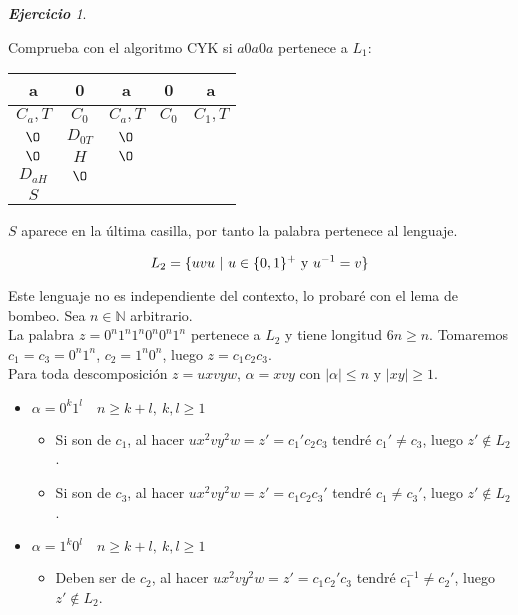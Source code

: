 \documentclass[12pt,spanish]{article}
\theoremstyle{definition}
\theoremstyle{remark}
\newtheorem{exercise}{\textbf{Ejercicio}}%
\begin{document}
\begin{exercise}
\begin{multicols}{4}
  \end{multicols}

  Comprueba con el algoritmo CYK si $a0a0a$ pertenece a $L_1$:

  \begin{table}[H]
    \centering
    \begin{tabular}{|c|cccc} \hline a & \multicolumn{1}{c|}{0} &
\multicolumn{1}{c|}{a} & \multicolumn{1}{c|}{0} &
\multicolumn{1}{c|}{a} \\ \hline $C_a,T$ & \multicolumn{1}{c|}{$C_0$}
& \multicolumn{1}{c|}{$C_a,T$} & \multicolumn{1}{c|}{$C_0$} &
\multicolumn{1}{c|}{$C_1,T$} \\ \hline $\O$ &
\multicolumn{1}{c|}{$D_{0T}$} & \multicolumn{1}{c|}{$\O$} & & \\
\cline{1-3} $\O$ & \multicolumn{1}{c|}{$H$} &
\multicolumn{1}{c|}{$\O$} & & \\ \cline{1-3} $D_{aH}$ &
\multicolumn{1}{c|}{$\O$} & & & \\ \cline{1-2} $S$ & & & & \\
\cline{1-1}
    \end{tabular}
  \end{table}

  $S$ aparece en la última casilla, por tanto la palabra pertenece al
  lenguaje.

  \newpage
  
  \[L_2=\{uvu\ |\ u \in \{0,1\}^+ \text{ y } u^{-1}=v\}\vspace{5mm}\]
  
  Este lenguaje no es independiente del contexto, lo probaré con el
  lema de bombeo. Sea $n\in \mathbb{N}$ arbitrario.\\ 

  La palabra $z=0^n1^n1^n0^n0^n1^n$ pertenece a $L_2$ y tiene longitud
  $6n \geq n$. Tomaremos $c_1=c_3=0^n1^n$, $c_2=1^n0^n$, luego
  $z=c_1c_2c_3$. \\

  Para toda descomposición $z=uxvyw$, $\alpha=xvy$ con
  $|\alpha|\leq n$ y $|xy|\geq 1$.

  \begin{itemize}
  \item $\alpha = 0^k1^l \quad n \geq k+l,\ k,l\geq 1$
    \begin{itemize}
    \item Si son de $c_1$, al hacer $ux^2vy^2w=z'=c_1'c_2c_3$ tendré
      $c_1'\neq c_3$, luego $z' \notin L_2$.
    \item Si son de $c_3$, al hacer $ux^2vy^2w=z'=c_1c_2c_3'$ tendré
      $c_1\neq c_3'$, luego $z' \notin L_2$.
    \end{itemize}
  \item $\alpha = 1^k0^l \quad n \geq k+l,\ k,l\geq 1$
    \begin{itemize}
    \item Deben ser de $c_2$, al hacer $ux^2vy^2w=z'=c_1c_2'c_3$ tendré
      $c_1^{-1}\neq c_2'$, luego $z' \notin L_2$.
    \end{itemize}


\end{itemize}
\end{exercise}
\end{document}
